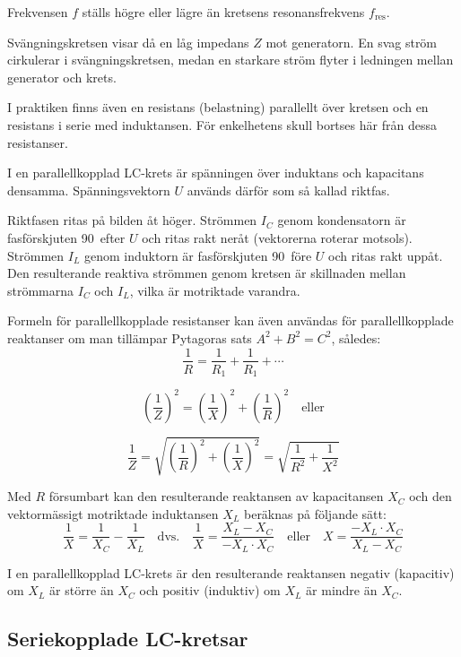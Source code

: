 Frekvensen \(f\) ställs högre eller lägre än kretsens resonansfrekvens
\(f_\text{{res}}\).

Svängningskretsen visar då en låg impedans \(Z\) mot generatorn.
En svag ström cirkulerar i svängningskretsen, medan en starkare ström flyter i
ledningen mellan generator och krets.

I praktiken finns även en resistans (belastning) parallellt över kretsen och en
resistans i serie med induktansen.
För enkelhetens skull bortses här från dessa resistanser.

I en parallellkopplad LC-krets är spänningen över induktans och kapacitans
densamma.
Spänningsvektorn \(U\) används därför som så kallad riktfas.

Riktfasen ritas på bilden åt höger.
Strömmen \(I_C\) genom kondensatorn är fasförskjuten 90\degree~efter \(U\) och
ritas rakt neråt (vektorerna roterar motsols).
Strömmen \(I_L\) genom induktorn är fasförskjuten 90\degree~före \(U\) och
ritas rakt uppåt.
Den resulterande reaktiva strömmen genom kretsen är skillnaden mellan
strömmarna \(I_C\) och \(I_L\), vilka är motriktade varandra.

Formeln för parallellkopplade resistanser kan även användas för
parallellkopplade reaktanser om man tillämpar Pytagoras sats
\(A^2 + B^2 = C^2\), således:
\[  \frac{1}{R} = \frac{1}{R_1} + \frac{1}{R_1} + \cdots \]

\[  \left(\frac{1}{Z}\right)^2 = \left(\frac{1}{X}\right)^2 + 
    \left(\frac{1}{R}\right)^2 \quad \text{eller} \]

\[  \frac{1}{Z} =
  \sqrt{\left(\frac{1}{R}\right)^2 + \left(\frac{1}{X}\right)^2} 
  = \sqrt{\frac{1}{R^2} + \frac{1}{X^2}} \]

Med \(R\) försumbart kan den resulterande reaktansen av kapacitansen \(X_C\)
och den vektormässigt motriktade induktansen \(X_L\) beräknas på följande sätt:
\[  
  \frac{1}{X} = \frac{1}{X_C} - \frac{1}{X_L} \quad \text{dvs.} \quad 
  \frac{1}{X} = \frac{X_L - X_C}{-X_L \cdot X_C} \quad \text{eller} \quad
  X = \frac{-X_L \cdot X_C}{X_L - X_C}
\]

I en parallellkopplad LC-krets är den resulterande reaktansen negativ
(kapacitiv) om \(X_L\) är större än \(X_C\) och positiv (induktiv) om \(X_L\) är
mindre än \(X_C\).

\subsection{Seriekopplade LC-kretsar}

